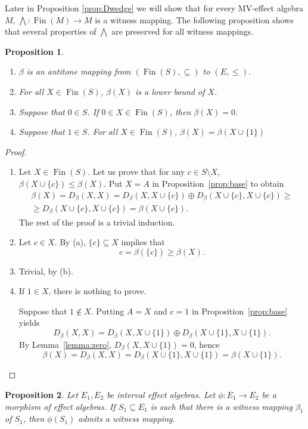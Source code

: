 \documentclass[letterpaper]{amsart}
\newtheorem{proposition}{Proposition}
\theoremstyle{definition}
\DeclareMathOperator*\Fin{Fin}
\begin{document}
Later in Proposition \ref{prop:Dwedge} we will show that
for every MV-effect algebra $M$, $\bigwedge:\Fin(M)\to M$
is a witness mapping. The following proposition shows that
several properties of $\bigwedge$ are preserved for all witness
mappings.

\begin{proposition}~
\begin{enumerate}
\item[(a)]
$\beta$ is an antitone mapping from $(\Fin(S),\subseteq)$ to $(E,\leq)$.
\item[(b)]
For all $X\in\Fin(S)$, $\beta(X)$ is a lower bound of $X$.
\item[(c)]
Suppose that $0\in S$. If $0\in X\in\Fin(S)$, then $\beta(X)=0$.
\item[(d)]
Suppose that $1\in S$.
For all $X\in\Fin(S)$, $\beta(X)=\beta(X\cup\{1\})$
\end{enumerate}
\end{proposition}
\begin{proof}~
\begin{enumerate}
\item[(a)]
Let $X\in\Fin(S)$.
Let us prove that for any $c\in S\setminus X$, 
$\beta(X\cup \{c\})\leq\beta(X)$.
Put $X=A$ in Proposition~\ref{prop:base} to obtain
\begin{align*}
\beta(X)=D_\beta(X,X)=D_\beta(X,X\cup\{c\})\oplus 
	D_\beta(X\cup\{c\},X\cup\{c\})\geq\\
\geq D_\beta(X\cup\{c\},X\cup\{c\})
=\beta(X\cup\{c\}).
\end{align*}
The rest of the proof is a trivial induction.
\item[(b)]
Let $c\in X$. By (a), $\{c\}\subseteq X$ implies that
$$
c=\beta(\{c\})\geq\beta(X).
$$
\item[(c)]
Trivial, by (b).
\item[(d)]
If $1\in X$, there is nothing to prove.

Suppose that $1\not\in X$.
Putting $A=X$ and $c=1$ in Proposition~\ref{prop:base} yields
$$
D_\beta(X,X)=D_\beta(X,X\cup\{1\})\oplus D_\beta(X\cup\{1\},X\cup\{1\}).
$$
By Lemma~\ref{lemma:zero}, $D_\beta(X,X\cup\{1\})=0$, hence
$$
\beta(X)=D_\beta(X,X)=D_\beta(X\cup\{1\},X\cup\{1\})=\beta(X\cup\{1\}).
$$
\end{enumerate}
\end{proof}
\begin{proposition}\label{prop:pushbeta}
Let $E_1,E_2$ be interval effect algebras.
Let $\phi:E_1\to E_2$ be a
morphism of effect algebras. 
If $S_1\subseteq E_1$ is such that there is
a witness mapping $\beta_1$ of $S_1$, then $\phi(S_1)$ admits a
witness mapping.
\end{proposition}
\end{document}
